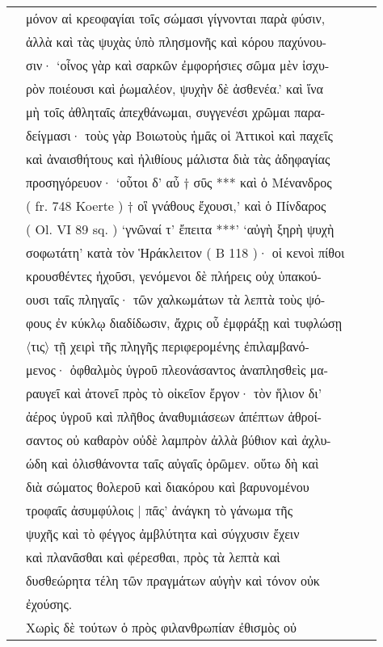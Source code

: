 \documentclass[a4paper,12pt]{article}
\begin{document}
\begin{center}
\begin{xtabular}{p{1cm}p{10.5454545454545cm}p{0.8cm}p{0cm}}
&μόνον αἱ κρεοφαγίαι τοῖς σώμασι γίγνονται παρὰ φύσιν, &&\\
&ἀλλὰ καὶ τὰς ψυχὰς ὑπὸ πλησμονῆς καὶ κόρου παχύνου-&&\\
&σιν· ‘οἶνος γὰρ καὶ σαρκῶν ἐμφορήσιες σῶμα μὲν ἰσχυ-&&\\
&ρὸν ποιέουσι καὶ ῥωμαλέον, ψυχὴν δὲ ἀσθενέα.’ καὶ ἵνα &&\\
&μὴ τοῖς ἀθληταῖς ἀπεχθάνωμαι, συγγενέσι χρῶμαι παρα-&&\\
&δείγμασι· τοὺς γὰρ Βοιωτοὺς ἡμᾶς οἱ Ἀττικοὶ καὶ παχεῖς &&\\
&καὶ ἀναισθήτους καὶ ἠλιθίους μάλιστα διὰ τὰς ἀδηφαγίας &&\\
&προσηγόρευον· ‘οὗτοι δ’ αὖ † σῦς *** καὶ ὁ Μένανδρος &&\\
&( \latin{}fr. 748 Koerte \greek{}) † οἳ γνάθους ἔχουσι,’ καὶ ὁ Πίνδαρος  &&\\
&( \latin{}Ol. VI 89 sq. \greek{}) ‘γνῶναί τ’ ἔπειτα ***’ ‘αὐγὴ ξηρὴ ψυχὴ &&\\
&σοφωτάτη’ κατὰ τὸν Ἡράκλειτον ( \latin{}B 118 \greek{})· οἱ κενοὶ πίθοι &&\\
&κρουσθέντες ἠχοῦσι, γενόμενοι δὲ πλήρεις οὐχ ὑπακού-&&\\
&ουσι ταῖς πληγαῖς· τῶν χαλκωμάτων τὰ λεπτὰ τοὺς ψό-&&\\
&φους ἐν κύκλῳ διαδίδωσιν, ἄχρις οὗ ἐμφράξῃ καὶ τυφλώσῃ &&\\
&〈τις〉 τῇ χειρὶ τῆς πληγῆς περιφερομένης ἐπιλαμβανό-&&\\
&μενος· ὀφθαλμὸς ὑγροῦ πλεονάσαντος ἀναπλησθεὶς μα-&&\\
&ραυγεῖ καὶ ἀτονεῖ πρὸς τὸ οἰκεῖον ἔργον· τὸν ἥλιον δι’ &&\\
&ἀέρος ὑγροῦ καὶ πλῆθος ἀναθυμιάσεων ἀπέπτων ἀθροί-&&\\
&σαντος οὐ καθαρὸν οὐδὲ λαμπρὸν ἀλλὰ βύθιον καὶ ἀχλυ-&&\\
&ώδη καὶ ὀλισθάνοντα ταῖς αὐγαῖς ὁρῶμεν. οὕτω δὴ καὶ &&\\
&διὰ σώματος θολεροῦ καὶ διακόρου καὶ βαρυνομένου &&\\
&τροφαῖς ἀσυμφύλοις | πᾶς’ ἀνάγκη τὸ γάνωμα τῆς &&\\
&ψυχῆς καὶ τὸ φέγγος ἀμβλύτητα καὶ σύγχυσιν ἔχειν &&\\
&καὶ πλανᾶσθαι καὶ φέρεσθαι, πρὸς τὰ λεπτὰ καὶ &&\\
&δυσθεώρητα τέλη τῶν πραγμάτων αὐγὴν καὶ τόνον οὐκ &&\\
&ἐχούσης. &&\\
&Χωρὶς δὲ τούτων ὁ πρὸς φιλανθρωπίαν ἐθισμὸς οὐ &&\\

\end{xtabular}
\end{center}
\end{document}

